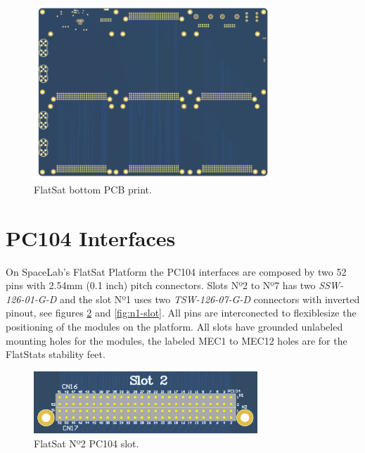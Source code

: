 \begin{figure}[!ht]
    \begin{center}
        \includegraphics[width=0.8\textwidth]{figures/flatsat_bottom_image.png}
        \caption{FlatSat bottom PCB print.}
        \label{fig:pcb-bottom}
    \end{center}
\end{figure}

\section{PC104 Interfaces}

On SpaceLab's FlatSat Platform the PC104 interfaces are composed by two 52 pins with 2.54mm (0.1 inch) pitch connectors. Slots Nº2 to Nº7 has two \textit{SSW-126-01-G-D} and the slot Nº1 uses two \textit{TSW-126-07-G-D} connectors with inverted pinout, see figures \ref{fig:n2-n7-slots} and \ref{fig:n1-slot}. All pins are interconected to flexiblesize the positioning of the modules on the platform. All slots have grounded unlabeled mounting holes for the modules, the labeled MEC1 to MEC12 holes are for the FlatStats stability feet.

\begin{figure}[!ht]
    \begin{center}
        \includegraphics[width=0.75\textwidth]{figures/pc104_slots_n2_to_n7.png}
        \caption{FlatSat Nº2 PC104 slot.}
        \label{fig:n2-n7-slots}
    \end{center}
\end{figure}

